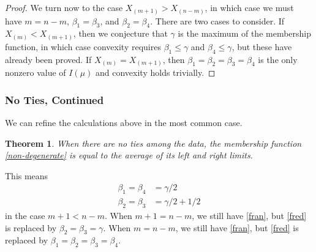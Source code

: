 \documentclass{article}
\newtheorem{theorem}{Theorem}
\begin{document}
\begin{proof}
We turn now to the case $X_{(m + 1)} > X_{(n - m)}$, in which case we
must have $m = n - m$, $\beta_1 = \beta_3$, and $\beta_2 = \beta_4$.
There are two cases to consider.  If $X_{(m)} < X_{(m + 1)}$, then
we conjecture that $\gamma$ is the maximum of the membership function,
in which case convexity requires $\beta_1 \le \gamma$ and $\beta_4 \le \gamma$,
but these have already been proved.
If $X_{(m)} = X_{(m + 1)}$, then $\beta_1 = \beta_2 = \beta_3 = \beta_4$ is
the only nonzero value of $I(\mu)$ and convexity holds trivially.
\end{proof}

\subsubsection{No Ties, Continued}

We can refine the calculations above in the most common case.
\begin{theorem} \label{th:half}
When there are no ties among the data, the membership
function \eqref{non-degenerate} is equal to the average of its left
and right limits.
\end{theorem}
This means
\begin{subequations}
\begin{align}
   \beta_1 = \beta_4 & = \gamma / 2
   \label{fran}
   \\
   \beta_2 = \beta_3 & = \gamma / 2 + 1 / 2
   \label{fred}
\end{align}
\end{subequations}
in the case $m + 1 < n - m$.
When $m + 1 = n - m$, we still have \eqref{fran},
but \eqref{fred} is replaced by $\beta_2 = \beta_3 = \gamma$.
When $m = n - m$, we still have \eqref{fran},
but \eqref{fred} is replaced by $\beta_1 = \beta_2 = \beta_3 = \beta_4$.
\end{document}
